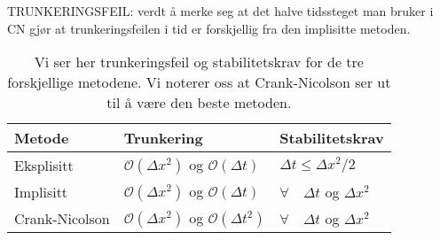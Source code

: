 \documentclass[12pt,a4paper,twocolumn]{article}
\begin{document}
\begin{flushleft}
TRUNKERINGSFEIL: verdt å merke seg at det halve tidssteget man bruker i CN gjør at trunkeringsfeilen i tid er forskjellig fra den implisitte metoden.
\begin{table}[H]
  \centering
  \begin{tabular}{ l l l }
    \toprule
    Metode & Trunkering & Stabilitetskrav \\
    \midrule
  Eksplisitt & $\mathcal{O}(\Delta x^2)$ og $\mathcal{O}(\Delta t)$ & $\Delta t \leq \Delta x^2/2$ \\
  Implisitt & $\mathcal{O}(\Delta x^2)$ og $\mathcal{O}(\Delta t)$ & $\forall \quad\Delta t$ og $\Delta x^2$ \\
  Crank-Nicolson & $\mathcal{O}(\Delta x^2)$ og $\mathcal{O}(\Delta t^2)$ & $\forall \quad\Delta t$ og $\Delta x^2$ \\
    \bottomrule
  \end{tabular}
  \caption{Vi ser her trunkeringsfeil og stabilitetskrav for de tre forskjellige metodene. Vi noterer oss at Crank-Nicolson ser ut til å være den beste metoden.}
  \label{tab:trunkering}
\end{table}


\end{flushleft}
\end{document}
